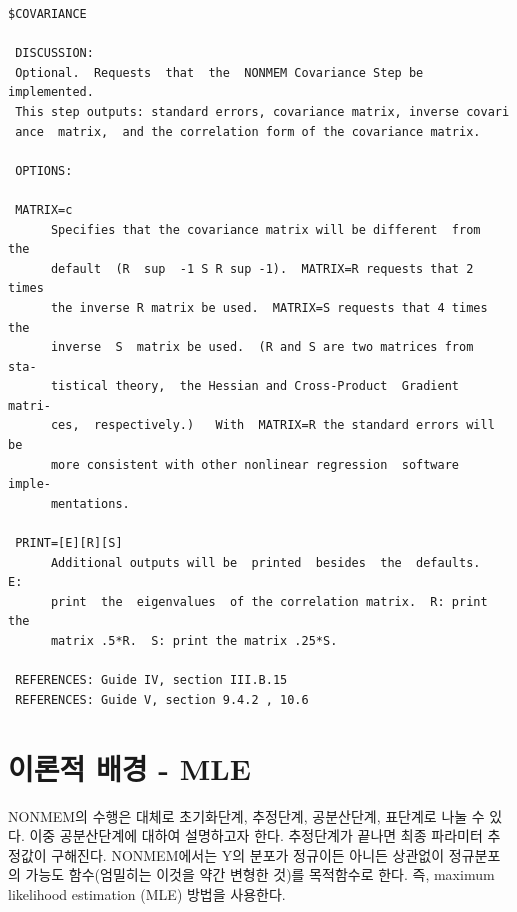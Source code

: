 \documentclass[
  11pt,
  krantz2,
  a4paper]{krantz}
\theoremstyle{definition}
\theoremstyle{definition}
\theoremstyle{definition}
\theoremstyle{remark}
\begin{document}
\begin{verbatim}
$COVARIANCE

 DISCUSSION:
 Optional.  Requests  that  the  NONMEM Covariance Step be implemented.
 This step outputs: standard errors, covariance matrix, inverse covari
 ance  matrix,  and the correlation form of the covariance matrix.

 OPTIONS:

 MATRIX=c
      Specifies that the covariance matrix will be different  from  the
      default  (R  sup  -1 S R sup -1).  MATRIX=R requests that 2 times
      the inverse R matrix be used.  MATRIX=S requests that 4 times the
      inverse  S  matrix be used.  (R and S are two matrices from  sta-
      tistical theory,  the Hessian and Cross-Product  Gradient  matri-
      ces,  respectively.)   With  MATRIX=R the standard errors will be
      more consistent with other nonlinear regression  software  imple-
      mentations.

 PRINT=[E][R][S]
      Additional outputs will be  printed  besides  the  defaults.   E:
      print  the  eigenvalues  of the correlation matrix.  R: print the
      matrix .5*R.  S: print the matrix .25*S.

 REFERENCES: Guide IV, section III.B.15
 REFERENCES: Guide V, section 9.4.2 , 10.6
\end{verbatim}


\hypertarget{uxc774uxb860uxc801-uxbc30uxacbd---mle}{%
\section{이론적 배경 - MLE}\label{uxc774uxb860uxc801-uxbc30uxacbd---mle}}


NONMEM의 수행은 대체로 초기화단계, 추정단계, 공분산단계, 표단계로 나눌 수 있다. 이중 공분산단계에 대하여 설명하고자 한다. 추정단계가 끝나면 최종 파라미터 추정값이 구해진다. NONMEM에서는 Y의 분포가 정규이든 아니든 상관없이 정규분포의 가능도 함수(엄밀히는 이것을 약간 변형한 것)를 목적함수로 한다. 즉, maximum likelihood estimation (MLE) 방법을 사용한다.
\end{document}
